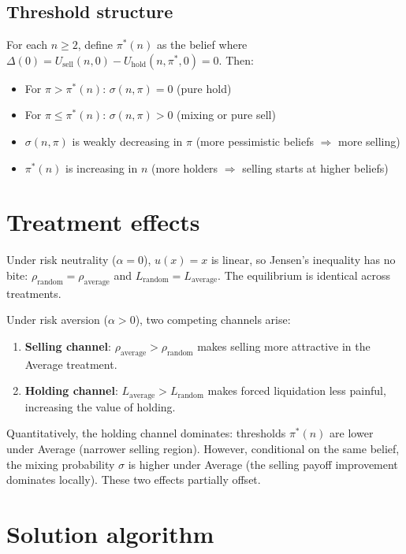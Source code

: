 \documentclass[11pt]{article}
\begin{document}
\subsection{Threshold structure}

For each $n \geq 2$, define $\pi^*(n)$ as the belief where
$\Delta(0) = U_{\text{sell}}(n, 0) - U_{\text{hold}}(n, \pi^*, 0) = 0$. Then:
\begin{itemize}
    \item For $\pi > \pi^*(n)$: $\sigma(n, \pi) = 0$ (pure hold)
    \item For $\pi \leq \pi^*(n)$: $\sigma(n, \pi) > 0$ (mixing or pure sell)
    \item $\sigma(n, \pi)$ is weakly decreasing in $\pi$ (more pessimistic
          beliefs $\Rightarrow$ more selling)
    \item $\pi^*(n)$ is increasing in $n$ (more holders $\Rightarrow$ selling
          starts at higher beliefs)
\end{itemize}

\section{Treatment effects}

Under risk neutrality ($\alpha = 0$), $u(x) = x$ is linear, so Jensen's
inequality has no bite:
$\rho_{\text{random}} = \rho_{\text{average}}$ and
$L_{\text{random}} = L_{\text{average}}$. The equilibrium is identical across
treatments.

Under risk aversion ($\alpha > 0$), two competing channels arise:

\begin{enumerate}
    \item \textbf{Selling channel}: $\rho_{\text{average}} > \rho_{\text{random}}$
    makes selling more attractive in the Average treatment.

    \item \textbf{Holding channel}: $L_{\text{average}} > L_{\text{random}}$
    makes forced liquidation less painful, increasing the value of holding.
\end{enumerate}

Quantitatively, the holding channel dominates: thresholds $\pi^*(n)$ are lower
under Average (narrower selling region). However, conditional on the same
belief, the mixing probability $\sigma$ is higher under Average (the selling
payoff improvement dominates locally). These two effects partially offset.

\section{Solution algorithm}
\end{document}
